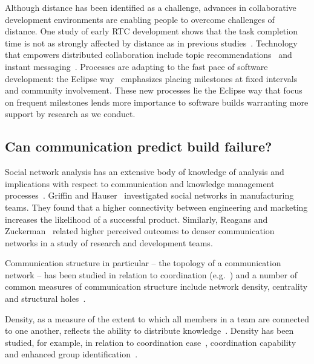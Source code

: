 Although distance has been identified as a challenge, advances in collaborative
development environments are enabling people to overcome challenges of distance.
One study of early RTC development
shows that the task completion time is not as strongly affected by distance as in previous studies~\cite{Nguyen:2008Distance}. Technology that empowers distributed collaboration include topic recommendations~\cite{carter2004} and instant messaging~\cite{niinimaki2008}. Processes are adapting to the fast pace of software development: the Eclipse way~\cite{frost:ieeesoftware:2007} emphasizes placing milestones at fixed intervals and community involvement.
These new processes lie the Eclipse way that focus on frequent milestones lends more importance to software builds warranting more support by research as we conduct.

\subsection{Can communication predict build failure?}
\label{sec:ResearchQuestions}
Social network analysis has an extensive body of knowledge of analysis and implications with respect to communication and knowledge management
processes~\cite{Burt:1995vo,Freeman:1979rl}. Griffin and
Hauser~\cite{Griffin:1992ms} investigated social networks in manufacturing teams.
They found that a higher connectivity between engineering and marketing increases
the likelihood of a successful product. Similarly, Reagans and
Zuckerman~\cite{RayReagans:2001os} related higher perceived outcomes to denser
communication networks in a study of research and development teams.

Communication structure in particular -- the topology of a communication network
-- has been studied in relation to coordination
(e.g.~\cite{hossain:cscw:2006,hinds:cscw:2006}) and a number of common measures of
communication structure include network density, centrality and structural
holes~\cite{Wasserman:1994sq,Freeman:1979rl}.

Density, as a measure of the extent to which all members in a team are
connected to one another, reflects the ability to distribute
knowledge~\cite{Rulke:2000ys}. Density has been studied, for example, in relation
to coordination ease~\cite{hinds:cscw:2006}, coordination
capability~\cite{hossain:cscw:2006} and enhanced group
identification~\cite{RayReagans:2001os}.

